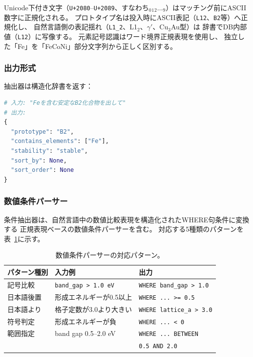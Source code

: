 \documentclass[5p,twocolumn]{elsarticle}
\begin{document}
Unicode下付き文字（\texttt{U+2080}--\texttt{U+2089}、すなわち$_0 {}_1 {}_2 \ldots {}_9$）はマッチング前にASCII数字に正規化される。
プロトタイプ名は投入時にASCII表記（\texttt{L12}、\texttt{B2}等）へ正規化し、
自然言語側の表記揺れ（\texttt{L1\_2}、L1$_2$、$\gamma'$、Cu$_3$Au型）は
辞書でDB内部値（\texttt{L12}）に写像する。
元素記号認識はワード境界正規表現を使用し、
独立した「Fe」を「FeCoNi」部分文字列から正しく区別する。

\subsubsection{出力形式}

抽出器は構造化辞書を返す：

\begin{lstlisting}[language=Python,caption={条件抽出の例。},label=lst:extract]
# 入力: "Feを含む安定なB2化合物を出して"
# 出力:
{
  "prototype": "B2",
  "contains_elements": ["Fe"],
  "stability": "stable",
  "sort_by": None,
  "sort_order": None
}
\end{lstlisting}

\subsubsection{数値条件パーサー}
\label{sec:numeric_parser}

条件抽出器は、自然言語中の数値比較表現を構造化されたWHERE句条件に変換する
正規表現ベースの数値条件パーサーを含む。
対応する5種類のパターンを表~\ref{tab:numeric_patterns}に示す。

\begin{table}[htbp]
  \centering
  \caption{数値条件パーサーの対応パターン。}
  \label{tab:numeric_patterns}
  \scriptsize
  \begin{tabular}{lll}
    \toprule
    パターン種別 & 入力例 & 出力 \\
    \midrule
    記号比較 & \texttt{band\_gap > 1.0 eV} & \texttt{WHERE band\_gap > 1.0} \\
    日本語後置 & 形成エネルギーが0.5以上 & \texttt{WHERE ... >= 0.5} \\
    日本語より & 格子定数が3.0より大きい & \texttt{WHERE lattice\_a > 3.0} \\
    符号判定 & 形成エネルギーが負 & \texttt{WHERE ... < 0} \\
    範囲指定 & band gap 0.5--2.0 eV & \texttt{WHERE ... BETWEEN} \\
             &                       & \texttt{0.5 AND 2.0} \\
    \bottomrule
  \end{tabular}
\end{table}
\end{document}
